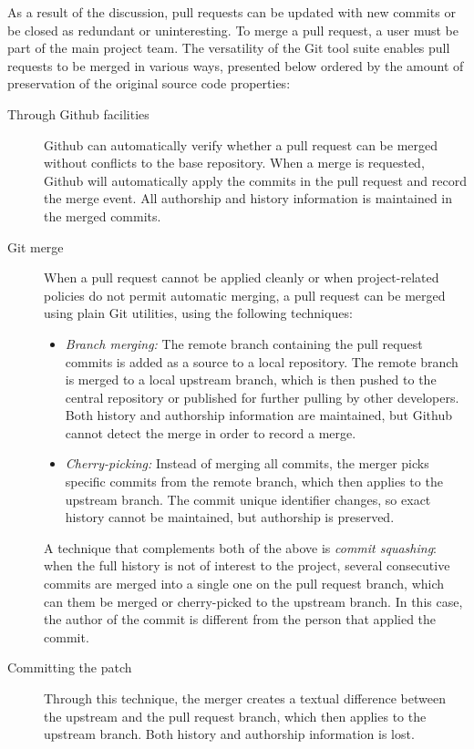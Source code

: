 \documentclass{sig-alternate}
\begin{document}
As a result of the discussion, pull requests can be updated with new commits or
be closed as redundant or uninteresting. To merge a pull request, a user must
be part of the main project team. The versatility of the Git tool suite enables
pull requests to be merged in various ways, presented below ordered by
the amount of preservation of the original source code properties:

\begin{description}

  \item[Through Github facilities] Github can automatically verify whether a
    pull request can be merged without conflicts to the base repository. When a
    merge is requested, Github will automatically apply the commits in the pull
    request and record the merge event. All authorship and history information
    is maintained in the merged commits.

  \item[Git merge] When a pull request cannot be applied cleanly or when
    project-related policies do not permit automatic merging, a pull request
    can be merged using plain Git utilities, using the following
    techniques: 

    \begin{itemize}

      \item \emph{Branch merging:} The remote branch containing the pull
        request commits is added as a source to a local repository. The remote 
        branch is merged to a local upstream branch, which is then pushed to
        the central repository or published for further pulling by other
        developers. Both history and authorship information are maintained,
        but Github cannot detect the merge in order to record a merge. 

      \item \emph{Cherry-picking:} Instead of merging all commits, the merger
        picks specific commits from the remote branch, which then applies to the
        upstream branch. The commit unique identifier changes, so exact history
        cannot be maintained, but authorship is preserved.
    
    \end{itemize}

    A technique that complements both of the above is \emph{commit
    squashing}: when the full history is not of interest to the project,
    several consecutive commits are merged into a single one on the pull request
    branch, which can them be merged or cherry-picked to the upstream branch. In
    this case, the author of the commit is different from the person that
    applied the commit.

  \item [Committing the patch] Through this technique, the merger creates a
    textual difference between the upstream and the pull request branch, which
    then applies to the upstream branch. Both history and authorship information
    is lost.

\end{description}
\end{document}
